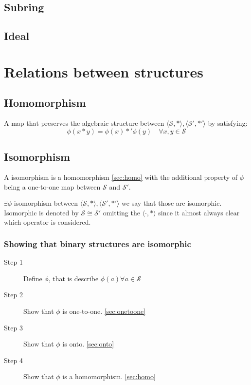 \documentclass[a4paper,11pt]{kth-mag}
\renewcommand{\SS}{\ensuremath{\mathcal{S}}}
\begin{document}
\subsection{Subring}
\subsection{Ideal}

\section{Relations between structures}
\subsection{Homomorphism}
\label{sec:homo}
A map that preserves the algebraic structure between 
$\langle\SS,*\rangle,\langle\SS',*'\rangle$ by satisfying:
\begin{equation}
    \phi(x*y)=\phi(x)*'\phi(y) \quad \forall x,y\in\SS
\end{equation}

\subsection{Isomorphism}
\label{sec:iso}
A isomorphism is a homomorphism \eqref{sec:homo} with the additional property
of $\phi$ being a one-to-one map between $\SS$ and $\SS'$.

$\exists \phi$ isomorphism between 
$\langle\SS,*\rangle,\langle\SS',*'\rangle$
we say that those are isomorphic. Isomorphic is denoted by $\SS \cong \SS'$ 
omitting the $\langle\cdot,*\rangle$ since it
almost always clear which operator is considered.

\subsubsection{Showing that binary structures are isomorphic}
\begin{description}
    \item[Step 1] Define $\phi$, that is describe $\phi(a) \forall a\in\SS$
    \item[Step 2] Show that $\phi$ is one-to-one. \eqref{sec:onetoone}
    \item[Step 3] Show that $\phi$ is onto. \eqref{sec:onto}
    \item[Step 4] Show that $\phi$ is a homomorphism. \eqref{sec:homo}

\end{description}
\end{document}
